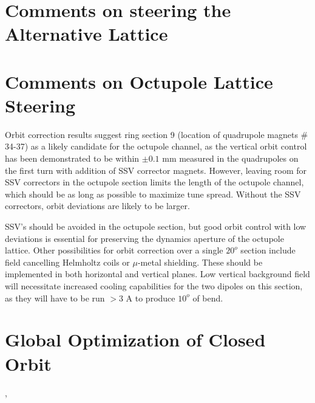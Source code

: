\section{Comments on steering the Alternative Lattice}


\section{Comments on Octupole Lattice Steering}

Orbit correction results suggest ring section 9 (location of quadrupole magnets \# 34-37) as a likely candidate for the octupole channel, as the vertical orbit control has been demonstrated to be within $\pm 0.1$ mm measured in the quadrupoles on the first turn with addition of SSV corrector magnets. However, leaving room for SSV correctors in the octupole section limits the length of the octupole channel, which should be as long as possible to maximize tune spread. Without the SSV correctors, orbit deviations are likely to be larger. 

SSV's should be avoided in the octupole section, but good orbit control with low deviations is essential for preserving the dynamics aperture of the octupole lattice. Other possibilities for orbit correction over a single $20^o$ section include field cancelling Helmholtz coils or $\mu$-metal shielding. These should be implemented in both horizontal and vertical planes. Low vertical background field will necessitate increased cooling capabilities for the two dipoles on this section, as they will have to be run $>3$ A to produce $10^o$ of bend. 




\section{Global Optimization of Closed Orbit}
\cite{Kirkpatrick2015} %
\cite{Huang2013}, \cite{LevonRCDS} %

